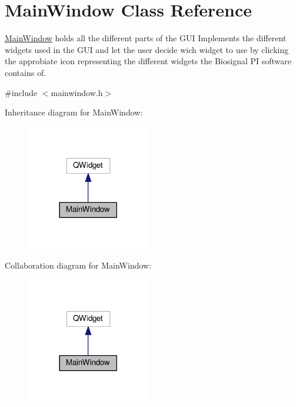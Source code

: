 \hypertarget{classMainWindow}{}\section{Main\+Window Class Reference}
\label{classMainWindow}


\hyperlink{classMainWindow}{Main\+Window} holds all the different parts of the G\+UI Implements the different widgets used in the G\+UI and let the user decide wich widget to use by clicking the approbiate icon representing the different widgets the Biosignal PI software contains of.  




{\ttfamily \#include $<$mainwindow.\+h$>$}



Inheritance diagram for Main\+Window\+:\nopagebreak
\begin{figure}[H]
\begin{center}
\leavevmode
\includegraphics[width=153pt]{classMainWindow__inherit__graph}
\end{center}
\end{figure}


Collaboration diagram for Main\+Window\+:\nopagebreak
\begin{figure}[H]
\begin{center}
\leavevmode
\includegraphics[width=153pt]{classMainWindow__coll__graph}
\end{center}
\end{figure}
